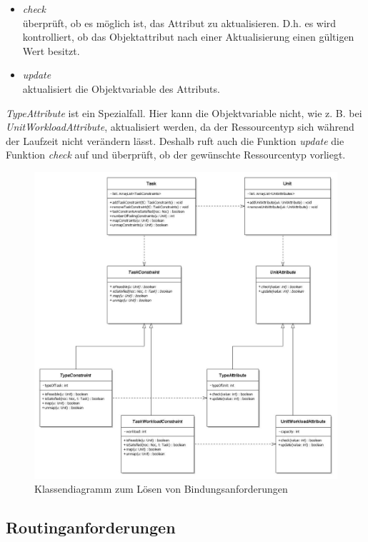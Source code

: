 \begin{itemize}
\item \textit{check}\\
überprüft, ob es möglich ist, das Attribut zu aktualisieren. D.h. es wird kontrolliert, ob das Objektattribut nach einer Aktualisierung einen gültigen Wert besitzt.
\item \textit{update} \\
aktualisiert die Objektvariable des Attributs.
\end{itemize}


\textit{TypeAttribute} ist ein Spezialfall. Hier kann die Objektvariable nicht, wie z. B. bei \textit{UnitWorkloadAttribute}, aktualisiert werden, da der Ressourcentyp sich während der Laufzeit nicht verändern lässt. Deshalb ruft auch die Funktion \textit{update} die Funktion \textit{check} auf und überprüft, ob der gewünschte Ressourcentyp vorliegt.


\begin{figure}[H]\centering
  \includegraphics[width = 150mm]{bilder/task-unit.jpg}
  \caption{Klassendiagramm zum Lösen von Bindungsanforderungen}\label{fig:klBind}
\end{figure}

\subsection{Routinganforderungen}\label{routinganforderung}

